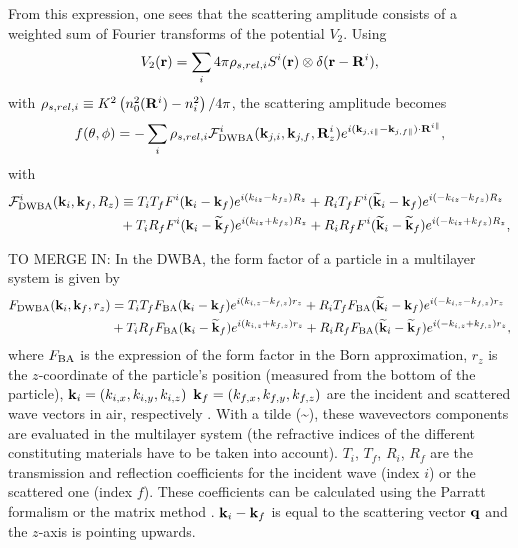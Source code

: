 From this expression, one sees that the scattering amplitude consists of a weighted sum of Fourier transforms of the potential $V_2$. Using
\begin{equation*}
  V_2(\mathbf{r}) = \sum_i 4\pi \rho_{s,rel,i} S^i(\mathbf{r}) \otimes \delta(\mathbf{r} - \mathbf{R}^i),
\end{equation*}
with $\rho_{s,rel,i}\equiv  K^2\left( n_0^2(\mathbf{R}^i) - n_i^2 \right)/4\pi$, the scattering amplitude becomes
\begin{equation*}
  f(\theta, \phi) = -\sum_i  \rho_{s,rel,i} \mathcal{F}^i_{\text{DWBA}}(\mathbf{k}_{j,i},\mathbf{k}_{j,f},\mathbf{R}^i_z)e^{i(\mathbf{k}_{j,i\parallel}-\mathbf{k}_{j,f\parallel})\cdot \mathbf{R}^{i\parallel} },
\end{equation*}
with
\begin{align*}
  \mathcal{F}^i_\text{DWBA}(\mathbf{k}_i,\mathbf{k}_f,R_z) & \equiv T_iT_fF^i(\mathbf{k}_i-\mathbf{k}_f)e^{i(k_{iz}-k_{fz})R_z} + R_iT_fF^i(\mathbf{\widetilde{k}}_i-\mathbf{k}_f)e^{i(-k_{iz}-k_{fz})R_z} \\
  & + T_iR_fF^i(\mathbf{k}_i-\mathbf{\widetilde{k}}_f)e^{i(k_{iz}+k_{fz})R_z} + R_iR_fF^i(\mathbf{\widetilde{k}}_i-\mathbf{\widetilde{k}}_f)e^{i(-k_{iz}+k_{fz})R_z},
\end{align*}

TO MERGE IN:
In the DWBA, the form factor of a particle in a multilayer system is given by
\begin{align}
F_{\rm{DWBA}} (\mathbf{k}_i,\mathbf{k}_f, r_z) & = T_i T_f F_{\rm{BA}} (\mathbf{k}_i-\mathbf{k}_f) e^{i (k_{i,z}-k_{f,z}) r_z} + R_i T_f F_{\rm{BA}}(\mathbf{\widetilde{k}}_i-\mathbf{k}_f) e^{i(-k_{i,z}-k_{f,z})r_z}
 \nonumber \\
  &+ T_i R_f F_{\rm{BA}}(\mathbf{k}_i-\mathbf{\widetilde{k}}_f)e^{i(k_{i,z}+k_{f,z})r_z} + R_iR_fF_{\rm{BA}} (\mathbf{\widetilde{k}}_i-\mathbf{\widetilde{k}}_f)e^{i(-k_{i,z}+k_{f,z})r_z}, \label{eq:dwbageneral}
\end{align}
where $F_{\rm{BA}}$ is the expression of the form factor in the Born approximation, $r_z$ is the $z$-coordinate of the particle's position (measured from the bottom of the particle), $\mathbf{k}_i=(k_{i,x}, k_{i,y}, k_{i,z})$ $\mathbf{k}_f=(k_{f,x}, k_{f,y}, k_{f,z})$ are the incident and scattered wave vectors in air, respectively \cite{RaSS95}. With a tilde (\~{}), these wavevectors components are evaluated in the multilayer system (the refractive indices of the different constituting materials have to be taken into account). 
$T_i$, $T_f$, $R_i$, $R_f$ are the transmission and reflection coefficients for the incident wave (index $i$) or the scattered one (index $f$). These coefficients can be calculated using the Parratt formalism \cite{Par54} or the matrix method \cite{BoWo99}. $\mathbf{k}_i-\mathbf{k}_f$ is equal to the scattering vector $\mathbf{q}$ and the $z$-axis is pointing upwards.\\


